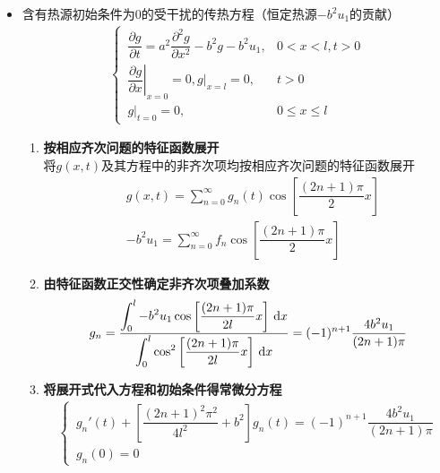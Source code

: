 \begin{enumerate}[{\textbf{步骤}}1 ]
\begin{itemize}
		\item 含有热源初始条件为0的受干扰的传热方程（恒定热源$-b^2u_1$的贡献）
		\begin{align}
			\begin{cases}
				\, \dfrac{\partial g}{\partial t} = a^2 \dfrac{\partial^2 g}{\partial x^2} - b^2 g - b^2 u_1, &0<x<l,t>0 \\[0.5em]
				\, \left. \dfrac{\partial g}{\partial x} \right|_{x = 0} = 0, g|_{x = l} = 0, &t>0\\[0.5em]
				\, g|_{t = 0} = 0, &0 \le x \le l
			\end{cases}
		\end{align}
		\begin{enumerate}[\textbf{步骤} 1 ]
			\item \textbf{按相应齐次问题的特征函数展开}\\
			将$g(x,t)$及其方程中的非齐次项均按相应齐次问题的特征函数展开
			\begin{align}
				&g(x,t) = \sum_{n = 0}^{\infty} g_n(t)\cos \left[\dfrac{(2n+1)\pi}{2} x\right]\\[0.5em]
				&-b^2u_1 = \sum_{n = 0}^{\infty} f_n\cos \left[\dfrac{(2n+1)\pi}{2} x\right]
			\end{align}
			
			\item \textbf{由特征函数正交性确定非齐次项叠加系数}
			\begin{align}
				g_n = \dfrac{\displaystyle \int_0^l -b^2 u_1\cos \left[\dfrac{(2n+1)\pi}{2l}x\right]  \, {\rm{d}} x}{ \displaystyle \int_0^l \cos^2 \left[\dfrac{(2n+1)\pi}{2l} x\right] \, {\rm{d}} x} = (-1)^{n+1} \dfrac{4 b^2 u_1}{(2n+1) \pi}
			\end{align}
			
			\item \textbf{将展开式代入方程和初始条件得常微分方程}
			\begin{align}
				\begin{cases}
					\, g_n'(t) + \left[\dfrac{(2n+1)^2\pi^2}{4l^2} + b^2\right] g_n(t) = (-1)^{n+1} \dfrac{4 b^2 u_1}{(2n+1) \pi} \\[0.5em]
					\, g_n(0) = 0
				\end{cases}
			\end{align}
			

\end{enumerate}
\end{itemize}
\end{enumerate}
